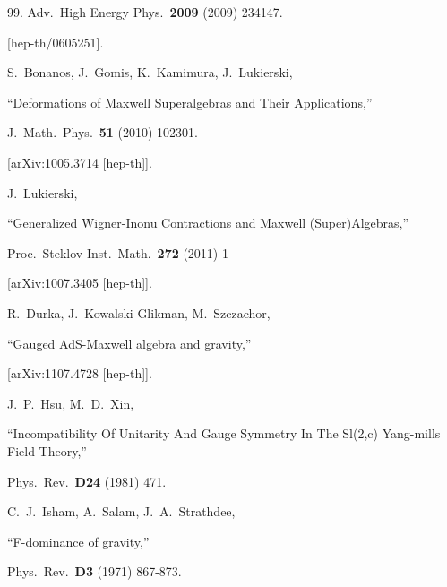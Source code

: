 \documentclass [prd,reprint,eqsecnum,nofootinbib]  {revtex4-1}
\begin{document}
\begin{thebibliography}{99.}
  Adv.\ High Energy Phys.\  {\bf 2009 } (2009)  234147.

  [hep-th/0605251].





  S.~Bonanos, J.~Gomis, K.~Kamimura, J.~Lukierski,

  ``Deformations of Maxwell Superalgebras and Their Applications,''

  J.\ Math.\ Phys.\  {\bf 51 } (2010)  102301.

  [arXiv:1005.3714 [hep-th]].





  J.~Lukierski,

  ``Generalized Wigner-Inonu Contractions and Maxwell (Super)Algebras,''

  Proc.\ Steklov Inst.\ Math.\  {\bf 272} (2011) 1

  [arXiv:1007.3405 [hep-th]].






  R.~Durka, J.~Kowalski-Glikman, M.~Szczachor,

  ``Gauged AdS-Maxwell algebra and gravity,''

[arXiv:1107.4728 [hep-th]].









  J.~P.~Hsu, M.~D.~Xin,

  ``Incompatibility Of Unitarity And Gauge Symmetry In The Sl(2,c) Yang-mills Field Theory,''

  Phys.\ Rev.\  {\bf D24 } (1981)  471.





  C.~J.~Isham, A.~Salam, J.~A.~Strathdee,

  ``F-dominance of gravity,''

  Phys.\ Rev.\  {\bf D3 } (1971)  867-873.




\end{thebibliography}
\end{document}
